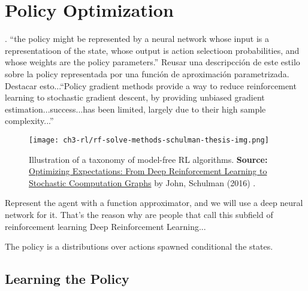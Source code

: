 \section{Policy Optimization}


. ``the policy might be represented by a neural network whose input is a representatioon of the state, whose output is action selectioon probabilities, and whose weights are the policy parameters.'' \cite{sutton1999policy} Reusar una descripcción de este estilo sobre la policy representada por una función de aproximación parametrizada. \\

\noindent Destacar esto...``Policy gradient methods provide a way to reduce reinforcement learning to stochastic gradient descent, by providing unbiased gradient estimation...success...has been limited, largely due to their high sample complexity...'' \\


\begin{figure}[h]
    \centering
    \texttt{[image: ch3-rl/rf-solve-methods-schulman-thesis-img.png]}
    \captionsetup{width=\textwidth} %
    \caption{Illustration of a taxonomy of model-free RL algorithms. \textbf{Source:} \href{https://rail.eecs.berkeley.edu/deeprlcourse/}{Optimizing Expectations: From Deep Reinforcement Learning to Stochastic Coomputation Graphs} by John, Schulman (2016) \cite{schulman2016optimizing}.}
    \label{fig:rl-model-free-taxonomy}
  \end{figure}

Represent the agent with a function approximator, and we will use a deep neural network for it. That's the reason why are people that call this subfield of reinforcement learning Deep Reinforcement Learning...

The policy is a distributions over actions spawned conditional the states.


\subsection{Learning the Policy}


